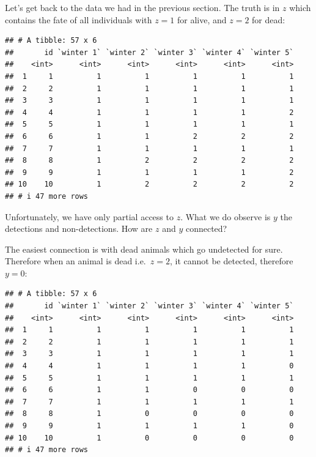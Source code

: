 \documentclass[
  12pt,
]{krantz}
\begin{document}
Let's get back to the data we had in the previous section. The truth is in \(z\) which contains the fate of all individuals with \(z = 1\) for alive, and \(z = 2\) for dead:

\begin{verbatim}
## # A tibble: 57 x 6
##       id `winter 1` `winter 2` `winter 3` `winter 4` `winter 5`
##    <int>      <int>      <int>      <int>      <int>      <int>
##  1     1          1          1          1          1          1
##  2     2          1          1          1          1          1
##  3     3          1          1          1          1          1
##  4     4          1          1          1          1          2
##  5     5          1          1          1          1          1
##  6     6          1          1          2          2          2
##  7     7          1          1          1          1          1
##  8     8          1          2          2          2          2
##  9     9          1          1          1          1          2
## 10    10          1          2          2          2          2
## # i 47 more rows
\end{verbatim}

Unfortunately, we have only partial access to \(z\). What we do observe is \(y\) the detections and non-detections. How are \(z\) and \(y\) connected?

The easiest connection is with dead animals which go undetected for sure. Therefore when an animal is dead i.e.~\(z = 2\), it cannot be detected, therefore \(y = 0\):

\begin{verbatim}
## # A tibble: 57 x 6
##       id `winter 1` `winter 2` `winter 3` `winter 4` `winter 5`
##    <int>      <int>      <int>      <int>      <int>      <int>
##  1     1          1          1          1          1          1
##  2     2          1          1          1          1          1
##  3     3          1          1          1          1          1
##  4     4          1          1          1          1          0
##  5     5          1          1          1          1          1
##  6     6          1          1          0          0          0
##  7     7          1          1          1          1          1
##  8     8          1          0          0          0          0
##  9     9          1          1          1          1          0
## 10    10          1          0          0          0          0
## # i 47 more rows
\end{verbatim}
\end{document}
